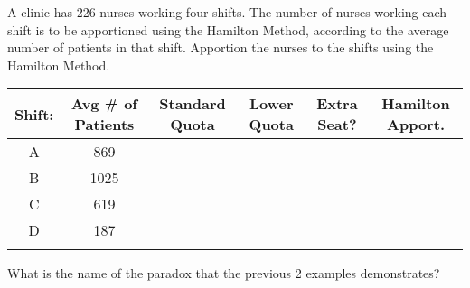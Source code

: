 \documentclass[11pt,epsfig]{article}
\begin{document}
\begin{problem}{10}
A clinic has 226 nurses working four shifts. The number of nurses working each shift is to be apportioned using the Hamilton Method, according to the average number of patients in that shift. Apportion the nurses to the shifts using the Hamilton Method.

 \begin{center}
 \begin{tabular}{ | c | c | c | c | c | c |}
   \hline
   Shift: & Avg \# of Patients & Standard Quota & Lower Quota & Extra Seat? & Hamilton Apport.\\ \hline
   A & 869 &  &  &  &  \\ \hline
   B & 1025 &  &  &  &  \\ \hline
   C & 619 &  &  &  &  \\ \hline
   D & 187 &  &  &  &  \\ \hline
    &  &  &  &  &  \\ \hline
   \end{tabular}
  \end{center}

\vfill
\end{problem}

\begin{problem}{2}
What is the name of the paradox that the previous 2 examples demonstrates?

\vfill
\end{problem}

\showpoints
\end{document}
